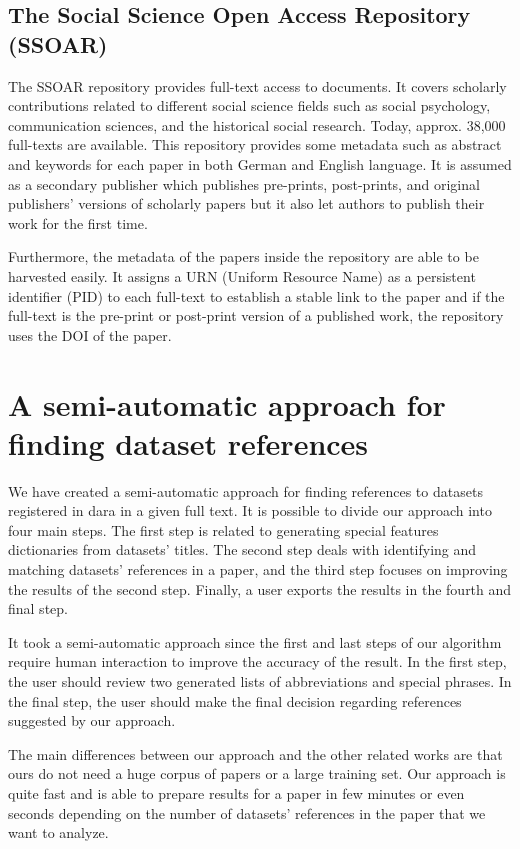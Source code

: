 \documentclass{IOS-Book-Article}
\newcommand{\dara}{\textsf{da\textbar ra}}
\begin{document}
\subsection{The Social Science Open Access Repository (SSOAR)}
The SSOAR repository provides full-text access to documents. It covers scholarly contributions related to different social science fields such as social psychology, communication sciences, and the historical social research. Today, approx. 38,000 full-texts are available.
This repository provides some metadata such as abstract and keywords for each paper in both German and English language. It is assumed as a secondary publisher which publishes pre-prints, post-prints, and original publishers' versions of scholarly papers but it also let authors to publish their work for the first time.

Furthermore, the metadata of the papers inside the repository are able to be harvested easily. 
It assigns a URN (Uniform Resource Name) as a persistent identifier (PID) to each full-text to establish a stable link to the paper and if the full-text is the pre-print or post-print version of a published work, the repository uses the DOI of the paper.

\section{A semi-automatic approach for finding dataset references}
\label{sec:approach}
We have created a semi-automatic approach for finding references to datasets registered in {\dara} in a given full text. 
It is possible to divide our approach into four main steps. The first step is related to generating special features dictionaries from datasets' titles. The second step deals with identifying and matching datasets' references in a paper, and the third step focuses on improving the results of the second step. Finally, a user exports the results in the fourth and final step.

It took a semi-automatic approach since 
the first and last steps of our algorithm require human interaction to improve the accuracy of the result. 
In the first step, the user should review two generated lists of abbreviations and special phrases. In the final step, the user should make the final decision regarding references suggested by our approach.

The main differences between our approach and the other related works are that ours do not need a huge corpus of papers or a large training set. Our approach is quite fast and is able to prepare results for a paper in few minutes or even seconds depending on the number of datasets' references in the paper that we want to analyze.
\end{document}
